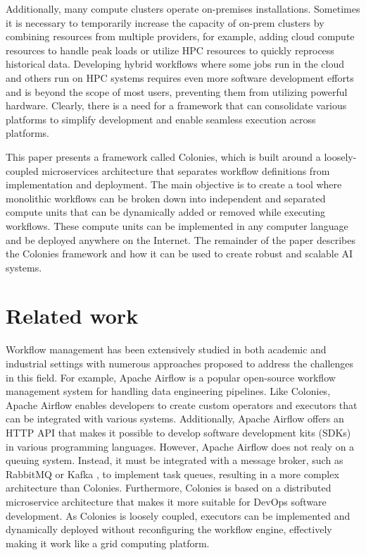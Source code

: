 \documentclass{article}
\begin{document}
Additionally, many compute clusters operate on-premises installations. Sometimes it is necessary to temporarily increase the capacity of on-prem clusters by combining resources from multiple providers, for example, adding cloud compute resources to handle peak loads or utilize HPC resources to quickly reprocess historical data. Developing hybrid workflows where some jobs run in the cloud and others run on HPC systems requires even more software development efforts and is beyond the scope of most users, preventing them from utilizing powerful hardware. Clearly, there is a need for a framework that can consolidate various platforms to simplify development and enable seamless execution across platforms.

This paper presents a framework called Colonies, which is built around a loosely-coupled microservices architecture that separates workflow definitions from implementation and deployment. The main objective is to create a tool where monolithic workflows can be broken down into independent and separated compute units that can be dynamically added or removed while executing workflows. These compute units can be implemented in any computer language and be deployed anywhere on the Internet. The remainder of the paper describes the Colonies framework and how it can be used to create robust and scalable AI systems. 

\section{Related work}
Workflow management has been extensively studied in both academic and industrial settings with numerous approaches proposed to address the challenges in this field. For example, Apache Airflow \cite{apache_airflow} is a popular open-source workflow management system for handling data engineering pipelines. Like Colonies, Apache Airflow enables developers to create custom operators and executors that can be integrated with various systems. Additionally, Apache Airflow offers an HTTP API that makes it possible to develop software development kits (SDKs) in various programming languages. However, Apache Airflow does not realy on a queuing system. Instead, it must be integrated with a message broker, such as RabbitMQ \cite{rabbitmq} or Kafka \cite{apache_kafka}, to implement task queues, resulting in a more complex architecture than Colonies. Furthermore, Colonies is based on a distributed microservice architecture that makes it more suitable for DevOps software development. As Colonies is loosely coupled, executors can be implemented and dynamically deployed without reconfiguring the workflow engine, effectively making it work like a grid computing platform. 
\end{document}

